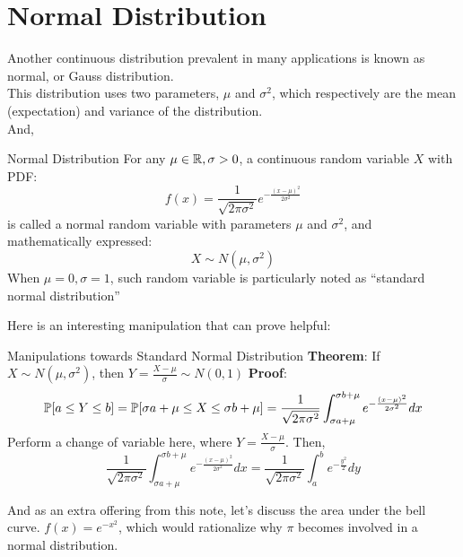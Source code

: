 \section{Normal Distribution}
Another continuous distribution prevalent in many applications is known as normal, or Gauss distribution. \\
This distribution uses two parameters, $\mu$ and $\sigma^2$, which respectively are the mean (expectation) and variance of the distribution. \\
And,
\begin{ln-define}{Normal Distribution}{}
    For any $\mu \in \R, \sigma > 0$, a continuous random variable $X$ with PDF:
    \[
        f(x) = \frac{1}{\sqrt{2 \pi \sigma^2}} e^{-\frac{{(x - \mu)}^2}{2\sigma^2}}
    \]
    is called a normal random variable with parameters $\mu$ and $\sigma^2$, and mathematically expressed:
    \[
        X \sim N(\mu, \sigma^2)
    \]
    When $\mu = 0, \sigma = 1$, such random variable is particularly noted as ``standard normal distribution''
\end{ln-define}
Here is an interesting manipulation that can prove helpful:
\begin{ln-theorem}{Manipulations towards Standard Normal Distribution}{}
    \textbf{Theorem}: If $X \sim N(\mu, \sigma^2)$, then $Y = \frac{X - \mu}{\sigma} \sim N(0, 1)$
    \tcblower
    \textbf{Proof}: \\
    \[
        \P[a \leq Y \leq b] = \P[\sigma a + \mu \leq X \leq \sigma b + \mu] = \frac{1}{\sqrt{2\pi\sigma^2}} \int_{\sigma a + \mu}^{\sigma b + \mu} e^{-\frac{{(x - \mu)}^2}{2\sigma^2}} dx
    \]
    Perform a change of variable here, where $Y = \frac{X - \mu}{\sigma}$. Then,
    \[
        \frac{1}{\sqrt{2\pi\sigma^2}} \int_{\sigma a + \mu}^{\sigma b + \mu} e^{-\frac{{(x - \mu)}^2}{2\sigma^2}} dx = \frac{1}{\sqrt{2\pi\sigma^2}} \int_a^b e^{-\frac{y^2}{2}} dy
    \]
\end{ln-theorem}
And as an extra offering from this note, let's discuss the area under the bell curve. $f(x) = e^{-x^2}$, which would rationalize why $\pi$ becomes involved in a normal distribution.

